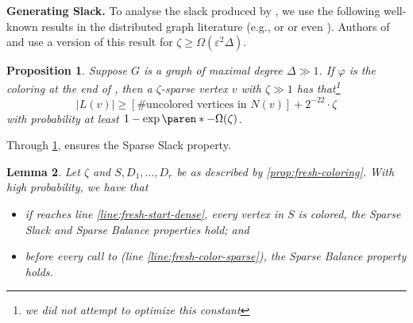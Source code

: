\documentclass[a4paper,english,11pt]{amsart}
\renewcommand{\paragraph}[1]{\medskip\noindent\textbf{#1}}
\newtheorem{lemma}{Lemma}[section]
\newtheorem{proposition}[lemma]{Proposition}
\theoremstyle{definition}
\renewcommand{\geq}{\geqslant}
\DeclarePairedDelimiter{\paren}()
\newcommand{\eps}{\varepsilon}
\newcommand{\col}{\varphi}
\begin{document}
\paragraph{Generating Slack.}
To analyse the slack produced by \OneShotColoring, we use the following well-known results in the distributed graph literature (e.g., \cite[Lemma 3.3]{CLP20} or \cite[Lemma 6.1]{HKMT21} or even \cite{RM02}). Authors of \cite[Lemma A.1]{ACK19} and \cite{BRW24} use a version of this result for $\zeta \geq \Omega(\eps^2 \Delta)$.
\begin{proposition}
    \label{thm:slack-gen}
    Suppose $G$ is a graph of maximal degree $\Delta \gg 1$.
    If $\col$ is the coloring at the end of \OneShotColoring, then a $\zeta$-sparse vertex $v$ with $\zeta \gg 1$ has that\footnote{we did not attempt to optimize this constant}
    \[
        |L(v)|
        \geq [\#\text{uncolored vertices in $N(v)$}] + 2^{-22} \cdot \zeta
    \]
    with probability at least $1 - \exp \paren*{ - \Omega( \zeta) }$.
\end{proposition}

Through \cref{thm:slack-gen}, \OneShotColoring ensures the Sparse Slack property.



\begin{lemma}
    \label{lem:fresh-slack}
    Let $\zeta$ and $S, D_1, \ldots, D_r$ be as described by \cref{prop:fresh-coloring}.
    With high probability, we have that
    \begin{itemize}
    \item if \FreshColoring reaches line \ref{line:fresh-start-dense}, every vertex in $S$ is colored, the Sparse Slack and Sparse Balance properties hold; and
    \item before every call to \RecolorSparse (line \ref{line:fresh-color-sparse}), the Sparse Balance property holds.
    \end{itemize}
\end{lemma}
\end{document}
